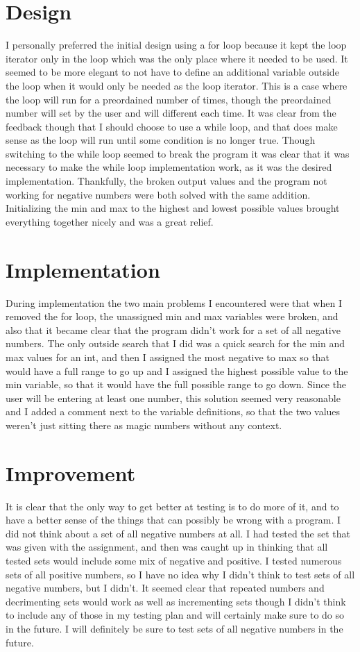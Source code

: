 \documentclass{article}
\begin{document}
\section*{Design}
I personally preferred the initial design using a for loop because it kept the loop iterator only in the loop which was the only place where it needed to be used. It seemed to be more elegant to not have to define an additional variable outside the loop when it would only be needed as the loop iterator. This is a case where the loop will run for a preordained number of times, though the preordained number will set by the user and will different each time. It was clear from the feedback though that I should choose to use a while loop, and that does make sense as the loop will run until some condition is no longer true. Though switching to the while loop seemed to break the program it was clear that it was necessary to make the while loop implementation work, as it was the desired implementation. Thankfully, the broken output values and the program not working for negative numbers were both solved with the same addition. Initializing the min and max to the highest and lowest possible values brought everything together nicely and was a great relief. 
\section*{Implementation}
During implementation the two main problems I encountered were that when I removed the for loop, the unassigned min and max variables were broken, and also that it became clear that the program didn't work for a set of all negative numbers. The only outside search that I did was a quick search for the min and max values for an int, and then I assigned the most negative to max so that would have a full range to go up and I assigned the highest possible value to the min variable, so that it would have the full possible range to go down. Since the user will be entering at least one number, this solution seemed very reasonable and I added a comment next to the variable definitions, so that the two values weren't just sitting there as magic numbers without any context.
\section*{Improvement}
It is clear that the only way to get better at testing is to do more of it, and to have a better sense of the things that can possibly be wrong with a program. I did not think about a set of all negative numbers at all. I had tested the set that was given with the assignment, and then was caught up in thinking that all tested sets would include some mix of negative and positive. I tested numerous sets of all positive numbers, so I have no idea why I didn't think to test sets of all negative numbers, but I didn't. It seemed clear that repeated numbers and decrimenting sets would work as well as incrementing sets though I didn't think to include any of those in my testing plan and will certainly make sure to do so in the future. I will definitely be sure to test sets of all negative numbers in the future.
\end{document}
